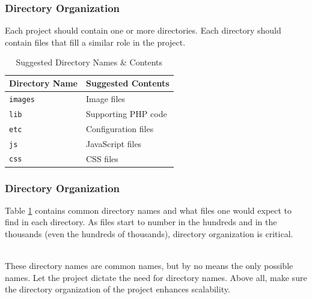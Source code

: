 \documentclass[aspectratio=169]{beamer}
\begin{document}
\begin{frame}
\frametitle{Directory Organization}
Each project should contain one or more directories. Each directory should contain files that fill a similar role in the project.
\begin{table}
\begin{tabular}{|l|l|}
\hline
\textbf{Directory Name} & \textbf{Suggested Contents}\\
\hline
\texttt{images} & Image files\\
\hline
\texttt{lib} & Supporting PHP code\\
\hline
\texttt{etc} & Configuration files\\
\hline
\texttt{js} & JavaScript files\\
\hline
\texttt{css} & CSS files\\
\hline
\end{tabular}
\caption{Suggested Directory Names \& Contents}
\label{tbl:dirsuggest}
\end{table}
\end{frame}

\begin{frame}
\frametitle{Directory Organization}
Table \ref{tbl:dirsuggest} contains common directory names and what files one would expect to find in each directory. As files start to number in the hundreds and in the thousands (even the hundreds of thousands), directory organization is critical.

\mbox{}\\
These directory names are common names, but by no means the only possible names. Let the project dictate the need for directory names. Above all, make sure the directory organization of the project enhances scalability.
\end{frame}
\end{document}
